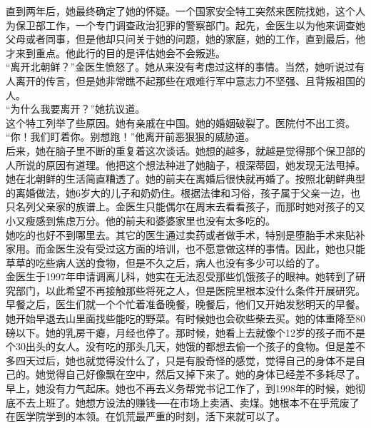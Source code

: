 直到两年后，她最终确定了她的怀疑。一个国家安全特工突然来医院找她，这个人为保卫部工作，一个专门调查政治犯罪的警察部门。起先，金医生以为他来调查她父母或者同事，但是他却只问关于她的问题，她的家庭，她的工作，直到最后，他才来到重点。他此行的目的是评估她会不会叛逃。\\

“离开北朝鲜？”金医生愤怒了。她从来没有考虑过这样的事情。当然，她听说过有人离开的传言，但是她非常瞧不起那些在艰难行军中意志力不坚强、且背叛祖国的人。\\

“为什么我要离开？”她抗议道。\\

这个特工列举了些原因。她有亲戚在中国。她的婚姻破裂了。医院付不出工资。\\

“你！我们盯着你。别想跑！”他离开前恶狠狠的威胁道。\\

后来，她在脑子里不断的重复着这次谈话。她想的越多，就越是觉得那个保卫部的人所说的原因有道理。他把这个想法种进了她脑子，根深蒂固，她发现无法甩掉。\\

她在北朝鲜的生活简直糟透了。她的前夫在离婚后很快就再婚了。按照北朝鲜典型的离婚做法，她6岁大的儿子和奶奶住。根据法律和习俗，孩子属于父亲一边，也只名列父亲家的族谱上。金医生只能偶尔在周末去看看孩子，而那时她对孩子的又小又瘦感到焦虑万分。他的前夫和婆婆家里也没有太多吃的。\\

她吃的也好不到哪里去。其它的医生通过卖药或者做手术，特别是堕胎手术来贴补家用。而金医生没有受过这方面的培训，也不愿意做这样的事情。因此，她也只能草草的吃些病人送的食物，但是不久之后，病人也没有多少可以给的了。\\

金医生于1997年申请调离儿科，她实在无法忍受那些饥饿孩子的眼神。她转到了研究部门，以此希望不再接触那些将死之人，但是医院里根本没什么条件开展研究。早餐之后，医生们就一个个忙着准备晚餐，晚餐后，他们又开始发愁明天的早餐。她开始早退去山里面找些能吃的野菜。有时候她也会砍些柴去买。她的体重降至80磅以下。她的乳房干瘪，月经也停了。那时候，她看上去就像个12岁的孩子而不是个30出头的女人。没有吃的那头几天，她饿的都想去偷一个孩子的食物。但是差不多四天过后，她也就觉得没什么了，只是有股奇怪的感觉，觉得自己的身体不是自己的。她觉得自己好像飘在空中，然后又掉下来了。她的身体已经差不多耗尽了。早上，她没有力气起床。她也不再去义务帮党书记工作了，到1998年的时候，她彻底不去上班了。她想方设法的赚钱──在市场上卖酒、卖煤。她根本不在乎荒废了在医学院学到的本领。在饥荒最严重的时刻，活下来就可以了。\\

